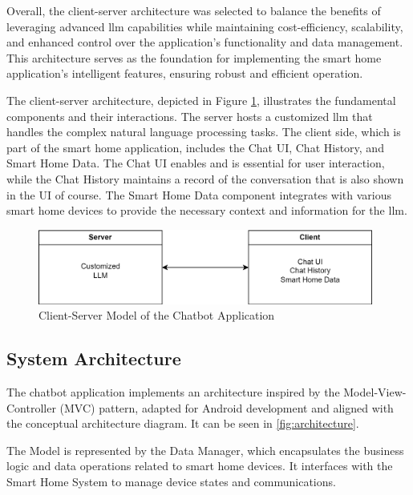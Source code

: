 Overall, the client-server architecture was selected to balance the benefits of leveraging advanced \gls{llm} capabilities while maintaining cost-efficiency, scalability, and enhanced control over the application's functionality and data management. This architecture serves as the foundation for implementing the smart home application's intelligent features, ensuring robust and efficient operation.

The client-server architecture, depicted in Figure \ref{fig:client-server-architecture}, illustrates the fundamental components and their interactions. The server hosts a customized \gls{llm} that handles the complex natural language processing tasks. The client side, which is part of the smart home application, includes the Chat UI, Chat History, and Smart Home Data. 
The Chat UI enables and is essential for user interaction, while the Chat History maintains a record of the conversation that is also shown in the UI of course. 
The Smart Home Data component integrates with various smart home devices to provide the necessary context and information for the \gls{llm}.

\begin{figure}[h]
    \centering
    \includegraphics[width=0.98\textwidth]{graphics/ClientServer.png}
    \caption{Client-Server Model of the Chatbot Application}
    \label{fig:client-server-architecture}
    \end{figure}


\subsection{System Architecture}

The chatbot application implements an architecture inspired by the Model-View-Controller (MVC) pattern, adapted for Android development and aligned with the conceptual architecture diagram.
It can be seen in \cref{fig:architecture}.

The Model is represented by the Data Manager, which encapsulates the business logic and data operations related to smart home devices. It interfaces with the Smart Home System to manage device states and communications.

